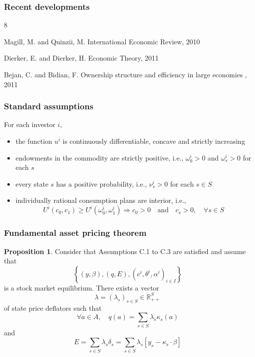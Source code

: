 \documentclass[blue]{beamer}
\def\R{\mathbb{R}}
\def\geq{\geqslant}
\def\et{\quad \textrm{and} \quad}
\theoremstyle{definition}
\theoremstyle{example}
\newtheorem*{proposition}{Proposition}
\begin{document}

\begin{frame}\frametitle{Recent developments}

\begin{thebibliography}{8}


  \beamertemplatearticlebibitems



    Magill, M. and Quinzii, M.
    \newblock  International Economic Review, 2010

    Dierker, E. and Dierker, H.
    \newblock Economic Theory, 2011

    Bejan, C. and Bidian, F.
    \newblock Ownership structure and efficiency in large economies
    , 2011

    \end{thebibliography}

\end{frame}


\begin{frame}\frametitle{Standard assumptions}


For each investor $i$,
\begin{itemize}
\item[(C.1)] the function $u^i$ is continuously differentiable, concave and strictly increasing
\item[(C.2)] endowments in the commodity are strictly positive, i.e., $\omega^i_0>0$ and $\omega^i_s >0$ for each $s$
\item[(C.3)] every state $s$ has a positive probability, i.e., $\nu^i_s >0$ for each $s\in S$
\item[(C.4)] individually rational consumption plans are interior, i.e.,
\[
U^i(c_0,c_1) \geq U^i(\omega^i_0, \omega^i_1) \Longrightarrow c_0 >0 \et c_s >0, \quad \forall s\in S
\]
\end{itemize}

\end{frame}


\begin{frame}\frametitle{Fundamental asset pricing theorem}


\begin{proposition}
Consider that Assumptions C.1 to C.3 are satisfied and assume that
\[
\left\{ (y,\beta), (q,E), (c^i,\theta^i,\alpha^i)_{i\in I}\right\}
\]
is a stock market equilibrium.
There exists a vector $$\lambda=(\lambda_s)_{s\in S} \in \R^S_{++}$$ of state price deflators such that
\[
\forall a \in A, \quad q(a) = \sum_{s\in S} \lambda_s \kappa_s(a)
\]
and
\[
E = \sum_{s\in S} \lambda_s \delta_s = \sum_{s\in S} \lambda_s [ y_s - \kappa_s \cdot \beta]
\]
\end{proposition}

\end{frame}
\end{document}
